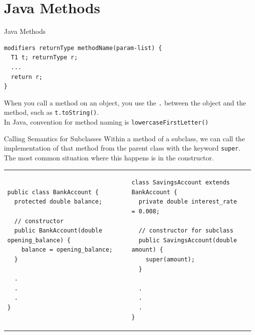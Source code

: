 \documentclass[aspectratio=169]{beamer}
\makeatletter
\newenvironment{splitslide}
{
\centering
\begin{tabular}{@{}m{0.50\textwidth} | m{0.025\textwidth}@{} m{0.4\textwidth}@{} m{0pt}@{}}
}
{
\end{tabular}
}
\makeatother
\begin{document}
\section{Java Methods}



\begin{frame}[fragile]{Java Methods}
\begin{verbatim}
modifiers returnType methodName(param-list) {
  T1 t; returnType r;
  ...
  return r;
}
\end{verbatim}

When you call a method on an object, you use the \texttt{.} between the object and the method, such as \texttt{t.toString()}. \\
\vspace{0.5em}
In Java, convention for method naming is {\tt lowercaseFirstLetter()}

\end{frame}



\begin{frame}[fragile]{Calling Semantics for Subclasses}
Within a method of a subclass, we can call the implementation of that method from the parent class with the keyword \texttt{super}. \\
\vspace{1em}
The most common situation where this happens is in the constructor. \\
\vspace{1em}
\begin{splitslide}

\begin{Verbatim}[fontsize=\tiny]
public class BankAccount {
  protected double balance;
  
  // constructor
  public BankAccount(double opening_balance) {
    balance = opening_balance;
  }
    
  .
  .
  .
}
\end{Verbatim}

&&

\begin{Verbatim}[fontsize=\tiny]
class SavingsAccount extends BankAccount {
  private double interest_rate = 0.008;
  
  // constructor for subclass
  public SavingsAccount(double amount) {
    super(amount);  
  }
  
  .
  .
  .
}
\end{Verbatim}

\end{splitslide}

\end{frame}
\end{document}
